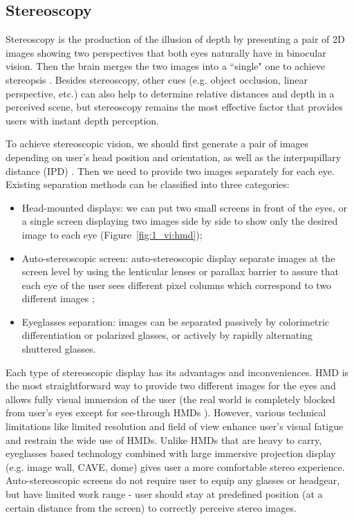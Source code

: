 \subsection{Stereoscopy}
\label{sec:stereo}

Stereoscopy is the production of the illusion of depth by presenting a pair of 2D images showing two perspectives that both eyes naturally have in binocular vision. Then the brain merges the two images into a ``single" one to achieve stereopsis \citep{Blake2006Perception}. Besides stereoscopy, other cues (e.g. object occlusion, linear perspective, etc.) can also help to determine relative distances and depth in a perceived scene, but stereoscopy remains the most effective factor that provides users with instant depth perception.

To achieve stereoscopic vision, we should first generate a pair of images depending on user's head position and orientation, as well as the interpupillary distance (IPD) \citep{Dodgson2004IPD}. Then we need to provide two images separately for each eye. Existing separation methods can be classified into three categories:

\begin{itemize}
\item Head-mounted displays: we can put two small screens in front of the eyes, or a single screen displaying two images side by side to show only the desired image to each eye (Figure~\ref{fig:1_vi:hmd});
\item Auto-stereoscopic screen: auto-stereoscopic display separate images at the screen level by using the lenticular lenses or parallax barrier to assure that each eye of the user sees different pixel columns which correspond to two different images \citep{Perlin2000Autostereo};
\item Eyeglasses separation: images can be separated passively by colorimetric differentiation or polarized glasses, or actively by rapidly alternating shuttered glasses.
\end{itemize}

Each type of stereoscopic display has its advantages and inconveniences. HMD is the most straightforward way to provide two different images for the eyes and allows fully visual immersion of the user (the real world is completely blocked from user's eyes except for see-through HMDs \citep{Schmalstieg2002Stube}). However, various technical limitations like limited resolution and field of view enhance user's visual fatigue and restrain the wide use of HMDs. Unlike HMDs that are heavy to carry, eyeglasses based technology combined with large immersive projection display (e.g. image wall, CAVE, dome) gives user a more comfortable stereo experience. Auto-stereoscopic screens do not require user to equip any glasses or headgear, but have limited work range - user should stay at predefined position (at a certain distance from the screen) to correctly perceive stereo images.

